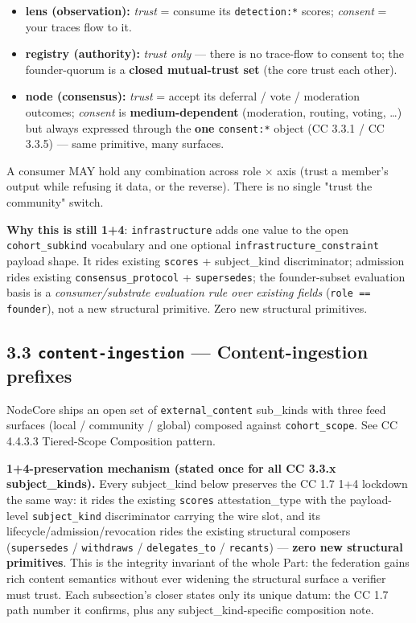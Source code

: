 \documentclass[11pt]{article}
\begin{document}
\begin{itemize}\setlength\itemsep{0pt}
\item \textbf{lens (observation):} \textit{trust} = consume its \texttt{detection:*} scores; \textit{consent} = your traces flow to it.
\item \textbf{registry (authority):} \textit{trust only} — there is no trace-flow to consent to; the founder-quorum is a \textbf{closed mutual-trust set} (the core trust each other).
\item \textbf{node (consensus):} \textit{trust} = accept its deferral / vote / moderation outcomes; \textit{consent} is \textbf{medium-dependent} (moderation, routing, voting, …) but always expressed through the \textbf{one} \texttt{consent:*} object (CC 3.3.1 / CC 3.3.5) — same primitive, many surfaces.
\end{itemize}


A consumer MAY hold any combination across role × axis (trust a member's output while refusing it data, or the reverse). There is no single "trust the community" switch.


\textbf{Why this is still 1+4}: \texttt{infrastructure} adds one value to the open \texttt{cohort\_subkind} vocabulary and one optional \texttt{infrastructure\_constraint} payload shape. It rides existing \texttt{scores} + subject\_kind discriminator; admission rides existing \texttt{consensus\_protocol} + \texttt{supersedes}; the founder-subset evaluation basis is a \textit{consumer/substrate evaluation rule over existing fields} (\texttt{role == founder}), not a new structural primitive. Zero new structural primitives.


\subsection*{3.3 \texttt{content-ingestion} — Content-ingestion prefixes}


NodeCore ships an open set of \texttt{external\_content} sub\_kinds with three feed surfaces (local / community / global) composed against \texttt{cohort\_scope}. See CC 4.4.3.3 Tiered-Scope Composition pattern.


\textbf{1+4-preservation mechanism (stated once for all CC 3.3.x subject\_kinds).} Every subject\_kind below preserves the CC 1.7 1+4 lockdown the same way: it rides the existing \texttt{scores} attestation\_type with the payload-level \texttt{subject\_kind} discriminator carrying the wire slot, and its lifecycle/admission/revocation rides the existing structural composers (\texttt{supersedes} / \texttt{withdraws} / \texttt{delegates\_to} / \texttt{recants}) — \textbf{zero new structural primitives}. This is the integrity invariant of the whole Part: the federation gains rich content semantics without ever widening the structural surface a verifier must trust. Each subsection's closer states only its unique datum: the CC 1.7 path number it confirms, plus any subject\_kind-specific composition note.
\end{document}
